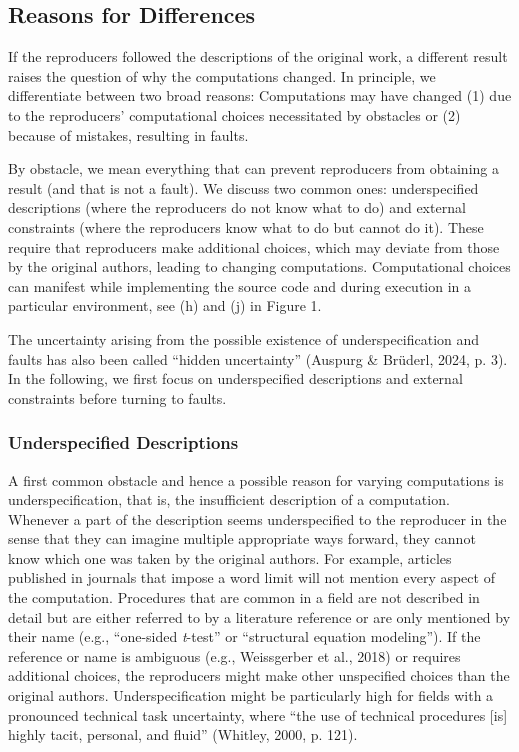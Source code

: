 \documentclass[authordate, meta]{jote-new-article}
\begin{document}
	\subsection{Reasons for Differences}



	If the reproducers followed the descriptions of the original work, a different result raises the question of why the computations changed. In principle, we differentiate between two broad reasons: Computations may have changed (1) due to the reproducers' computational choices necessitated by obstacles or (2) because of mistakes, resulting in faults.



	By obstacle, we mean everything that can prevent reproducers from obtaining a result (and that is not a fault). We discuss two common ones: underspecified descriptions (where the reproducers do not know what to do) and external constraints (where the reproducers know what to do but cannot do it). These require that reproducers make additional choices, which may deviate from those by the original authors, leading to changing computations. Computational choices can manifest while implementing the source code and during execution in a particular environment, see (h) and (j) in Figure 1.



	The uncertainty arising from the possible existence of underspecification and faults has also been called “hidden uncertainty” (Auspurg \& Brüderl, 2024, p. 3). In the following, we first focus on underspecified descriptions and external constraints before turning to faults.



	\subsubsection{Underspecified Descriptions}



	A first common obstacle and hence a possible reason for varying computations is underspecification, that is, the insufficient description of a computation. Whenever a part of the description seems underspecified to the reproducer in the sense that they can imagine multiple appropriate ways forward, they cannot know which one was taken by the original authors. For example, articles published in journals that impose a word limit will not mention every aspect of the computation. Procedures that are common in a field are not described in detail but are either referred to by a literature reference or are only mentioned by their name (e.g., “one-sided \emph{t}-test” or “structural equation modeling”). If the reference or name is ambiguous (e.g., Weissgerber et al., 2018) or requires additional choices, the reproducers might make other unspecified choices than the original authors. Underspecification might be particularly high for fields with a pronounced technical task uncertainty, where “the use of technical procedures [is] highly tacit, personal, and fluid” (Whitley, 2000, p. 121).
\end{document}
